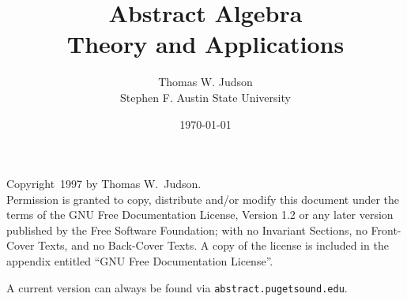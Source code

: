 \documentclass[11pt]{book}
\title{{\bf Abstract Algebra}\\Theory and Applications}
\author{Thomas W. Judson\\Stephen F. Austin State University}
\date{\today}
\begin{document}
%
\pagestyle{headings}
%
\frontmatter
%
\maketitle
%

\noindent Copyright\ 1997 by Thomas W.\ Judson.\\[12pt]
Permission is granted to copy, distribute and/or modify this document under the terms of the GNU Free Documentation License, Version 1.2 or any later version published by the Free Software Foundation; with no Invariant Sections, no Front-Cover Texts, and no Back-Cover Texts.  A copy of the license is included in the appendix entitled ``GNU Free Documentation License''.\par
\bigskip
%
\noindent 
A current version can always be found via {\tt abstract.pugetsound.edu}.
\clearpage
%

%
%
\mainmatter
%
%
%
%
%
%
%
\backmatter

{\small}

{\small\printindex}
%
%
\end{document}
